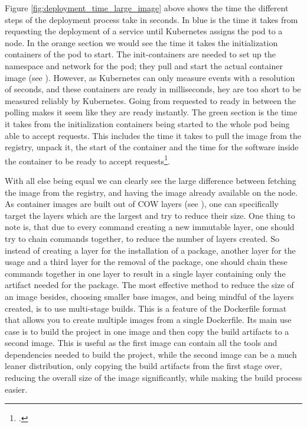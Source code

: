 Figure \ref{fig:deployment_time_large_image} above shows the time the different steps of the deployment process take in seconds.
In blue is the time it takes from requesting the deployment of a service until Kubernetes assigns the pod to a node.
In the orange section we would see the time it takes the initialization containers of the pod to start.
The init-containers are needed to set up the namespace and network for the pod;
they pull and start the actual container image (see ).
However, as Kubernetes can only measure events with a resolution of seconds,
and these containers are ready in milliseconds, hey are too short to be measured reliably by Kubernetes.
Going from requested to ready in between the polling makes it seem like they are ready instantly.
The green section is the time it takes from the initialization containers being started to the whole pod
being able to accept requests. This includes the time it takes to pull the image from the registry, unpack it,
the start of the container and the time for the software inside the container to be ready to accept requests\footcite{kubernetes-docsPodLifecycle}.

With all else being equal we can clearly see the large difference between fetching the image from the registry,
and having the image already available on the node.
As container images are built out of \ac{COW} layers (see ),
one can specifically target the layers which are the largest and try to reduce their size.
One thing to note is, that due to every command creating a new immutable layer,
one should try to chain commands together, to reduce the number of layers created.
So instead of creating a layer for the installation of a package, another layer for the usage
and a third layer for the removal of the package, one should chain these commands together in one layer to
result in a single layer containing only the artifact needed for the package.
The most effective method to reduce the size of an image besides, choosing smaller base images,
and being mindful of the layers created, is to use multi-stage builds.
This is a feature of the Dockerfile format that allows you to create multiple images from a single Dockerfile.
Its main use case is to build the project in one image and then copy the build artifacts to a second image.
This is useful as the first image can contain all the tools and dependencies needed to build the project,
while the second image can be a much leaner distribution, only copying the build artifacts from the first stage over,
reducing the overall size of the image significantly, while making the build process easier.

